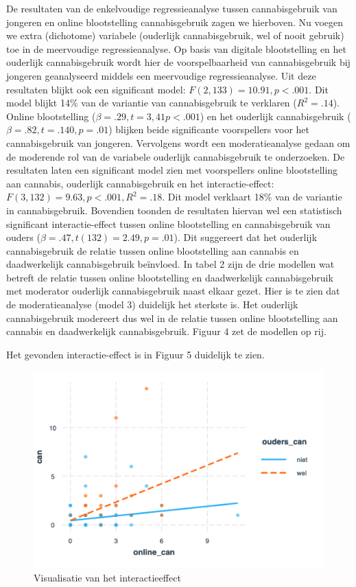 \documentclass[
  letterpaper,
  DIV=11,
  numbers=noendperiod]{scrartcl}
\begin{document}
De resultaten van de enkelvoudige regressieanalyse tussen
cannabisgebruik van jongeren en online blootstelling cannabisgebruik
zagen we hierboven. Nu voegen we extra (dichotome) variabele (ouderlijk
cannabisgebruik, wel of nooit gebruik) toe in de meervoudige
regressieanalyse. Op basis van digitale blootstelling en het ouderlijk
cannabisgebruik wordt hier de voorspelbaarheid van cannabisgebruik bij
jongeren geanalyseerd middels een meervoudige regressieanalyse. Uit deze
resultaten blijkt ook een significant model:
\(F(2,133) = 10.91, p < .001\). Dit model blijkt 14\% van de variantie
van cannabisgebruik te verklaren (\(R^2 = .14\)). Online blootstelling
(\(\beta = .29, t = 3,41 p <.001\)) en het ouderlijk cannabisgebruik
(\(\beta = .82, t = .140, p =.01\)) blijken beide significante
voorspellers voor het cannabisgebruik van jongeren. Vervolgens wordt een
moderatieanalyse gedaan om de moderende rol van de variabele ouderlijk
cannabisgebruik te onderzoeken. De resultaten laten een significant
model zien met voorspellers online blootstelling aan cannabis, ouderlijk
cannabisgebruik en het interactie-effect:
\(F(3, 132) = 9.63, p < .001, R^2 = .18\). Dit model verklaart 18\% van
de variantie in cannabisgebruik. Bovendien toonden de resultaten hiervan
wel een statistisch significant interactie-effect tussen online
blootstelling en cannabisgebruik van ouders
(\(β = .47, t(132) = 2.49, p = .01\)). Dit suggereert dat het ouderlijk
cannabisgebruik de relatie tussen online blootstelling aan cannabis en
daadwerkelijk cannabisgebruik beïnvloed. In tabel 2 zijn de drie
modellen wat betreft de relatie tussen online blootstelling en
daadwerkelijk cannabisgebruik met moderator ouderlijk cannabisgebruik
naast elkaar gezet. Hier is te zien dat de moderatieanalyse (model 3)
duidelijk het sterkste is. Het ouderlijk cannabisgebruik modereert dus
wel in de relatie tussen online blootstelling aan cannabis en
daadwerkelijk cannabisgebruik. Figuur 4 zet de modellen op rij.

Het gevonden interactie-effect is in Figuur 5 duidelijk te zien.

\begin{figure}

{\centering \includegraphics{images/Screenshot4.png}

}

\caption{Visualisatie van het interactieeffect}

\end{figure}
\end{document}
